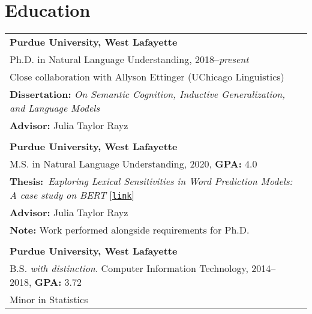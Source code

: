 \documentclass[11pt]{article}
\begin{document}
\section*{Education}
\begin{tabularx}{\textwidth}{@{}p{\textwidth}l}
\textbf{Purdue University, West Lafayette}\\
Ph.D. in Natural Language Understanding, 2018--\textit{present}\\
Close collaboration with Allyson Ettinger (UChicago Linguistics)\\
\textbf{Dissertation:} \textit{On Semantic Cognition, Inductive Generalization, and Language Models}\\
\textbf{Advisor:} Julia Taylor Rayz\\\\
\textbf{Purdue University, West Lafayette}\\
M.S. in Natural Language Understanding, 2020, \textbf{GPA:} 4.0\\
\textbf{Thesis:}~\textit{Exploring Lexical Sensitivities in Word Prediction Models: A case study on BERT} [\href{https://hammer.figshare.com/articles/thesis/Exploring_Lexical_Sensitivities_in_Word_Prediction_Models_A_case_study_on_BERT/13308830}{\texttt{link}}]\\
\textbf{Advisor:} Julia Taylor Rayz\\
\textbf{Note:} Work performed alongside requirements for Ph.D.\\\\

\textbf{Purdue University, West Lafayette}\\
B.S. \textit{with distinction}. Computer Information Technology, 2014--2018, \textbf{GPA:} 3.72\\
Minor in Statistics
\end{tabularx}
\end{document}
